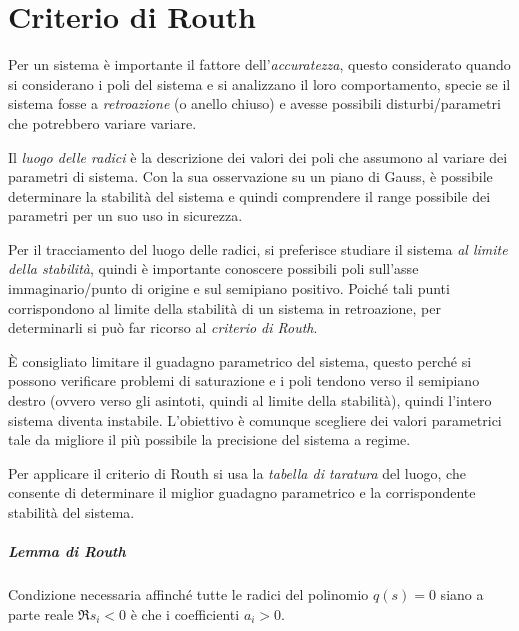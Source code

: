 \chapter{Criterio di Routh}

Per un sistema è importante il fattore dell'\emph{accuratezza}, questo considerato
quando si considerano i poli del sistema e si analizzano il loro comportamento,
specie se il sistema fosse a \emph{retroazione} (o anello chiuso) e avesse possibili
disturbi/parametri che potrebbero variare variare.

Il \emph{luogo delle radici} è la descrizione dei valori dei poli che assumono al variare
dei parametri di sistema. Con la sua osservazione su un piano di Gauss, è possibile
determinare la stabilità del sistema e quindi comprendere il range possibile dei
parametri per un suo uso in sicurezza.

Per il tracciamento del luogo delle radici, si preferisce studiare il sistema
\emph{al limite della stabilità}, quindi è importante conoscere possibili poli
sull'asse immaginario/punto di origine e sul semipiano positivo. Poiché tali
punti corrispondono al limite della stabilità di un sistema in retroazione, per
determinarli si può far ricorso al \emph{criterio di Routh}.

È consigliato limitare il guadagno parametrico del sistema, questo perché si
possono verificare problemi di saturazione e i poli tendono verso il semipiano
destro (ovvero verso gli asintoti, quindi al limite della stabilità), quindi
l'intero sistema diventa instabile. L'obiettivo è comunque scegliere dei valori
parametrici tale da migliore il più possibile la precisione del sistema a regime.

Per applicare il criterio di Routh si usa la \emph{tabella di taratura} del luogo,
che consente di determinare il miglior guadagno parametrico e la corrispondente
stabilità del sistema.

\paragraph{Lemma di Routh}
Condizione necessaria affinché tutte le radici del polinomio \(q(s) = 0\) siano a
parte reale \(\Re s_i < 0\) è che i coefficienti \(a_i > 0\).

